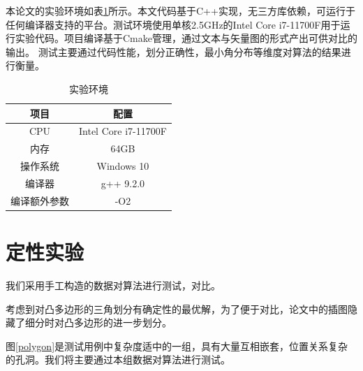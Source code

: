 本论文的实验环境如表\ref*{env}所示。本文代码基于C++实现，无三方库依赖，可运行于任何编译器支持的平台。测试环境使用单核2.5GHz的Intel Core i7-11700F用于运行实验代码。项目编译基于Cmake管理，通过文本与矢量图的形式产出可供对比的输出。
测试主要通过代码性能，划分正确性，最小角分布等维度对算法的结果进行衡量。
\begin{table}[h]
    \centering
    \caption{实验环境}
    \label{env}
    \begin{tabular}{cc}
    \hline
    项目   & 配置                   \\ \hline
    CPU  & Intel Core i7-11700F \\
    内存   & 64GB                 \\
    操作系统 & Windows 10           \\
    编译器  & g++ 9.2.0            \\
    编译额外参数 & -O2                  \\ \hline
    \end{tabular}
\end{table}

\section{定性实验}

我们采用手工构造的数据对算法进行测试，对比。

考虑到对凸多边形的三角划分有确定性的最优解，为了便于对比，论文中的插图隐藏了细分时对凸多边形的进一步划分。

图\ref*{polygon}是测试用例中复杂度适中的一组，具有大量互相嵌套，位置关系复杂的孔洞。我们将主要通过本组数据对算法进行测试。

